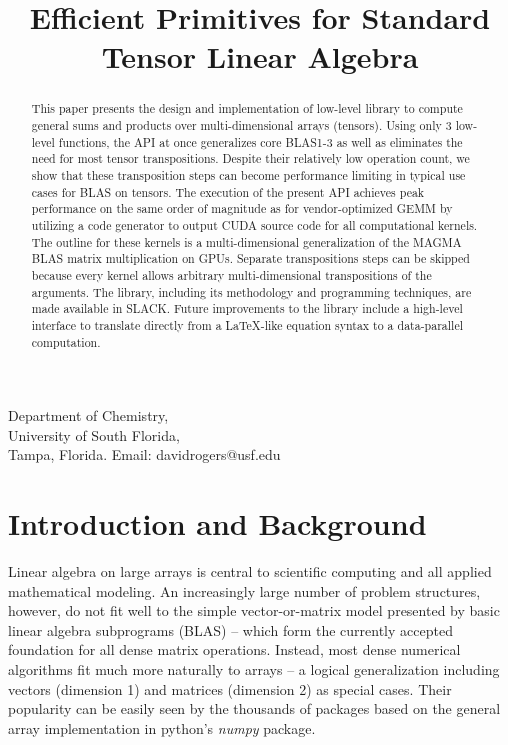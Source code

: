 \documentclass[preprint]{sigplanconf}
\begin{document}
\title{ Efficient Primitives for Standard Tensor Linear Algebra}
{Department of Chemistry, \\
University of South Florida, \\
Tampa, Florida.}
{Email: davidrogers@usf.edu}

\maketitle

\begin{abstract}
  This paper presents the design and implementation of low-level
library to compute general sums and products over multi-dimensional arrays (tensors).
Using only 3 low-level functions, the API at once generalizes
core BLAS1-3 as well as eliminates the need for most tensor transpositions.
Despite their relatively low operation count, we show that these transposition steps
can become performance limiting in typical use cases for BLAS on tensors.
The execution of the present API achieves peak performance on the same
order of magnitude as for vendor-optimized GEMM
by utilizing a code generator to output CUDA source code for all computational kernels.
The outline for these kernels is a multi-dimensional generalization
of the MAGMA BLAS matrix multiplication on GPUs.  Separate
transpositions steps can be skipped because every kernel allows arbitrary
multi-dimensional transpositions of the arguments.
The library, including its methodology and programming techniques, are
made available in SLACK.  Future improvements to the library include
a high-level interface to translate directly from a \LaTeX{}-like equation
syntax to a data-parallel computation.
\end{abstract}


\section{ Introduction and Background}

  Linear algebra on large arrays is central to scientific computing and all applied mathematical
modeling.  An increasingly large number of problem structures, however,
do not fit well to the simple vector-or-matrix model presented by basic linear
algebra subprograms (BLAS)\cite{blas} -- which form the currently accepted foundation for all
dense matrix operations.  Instead, most dense numerical algorithms fit much more naturally
to arrays -- a logical generalization including vectors (dimension 1) and matrices (dimension 2)
as special cases.  Their popularity can be easily seen by the thousands of packages based
on the general array implementation in python's {\em numpy} package.\cite{numpy}
\end{document}
